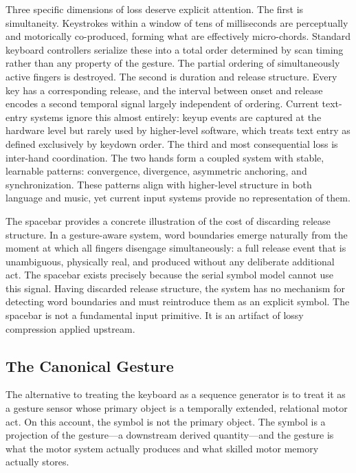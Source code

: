 \documentclass[12pt,a4paper]{article}
\theoremstyle{plain}
\theoremstyle{definition}
\theoremstyle{remark}
\begin{document}
Three specific dimensions of loss deserve explicit attention. The first is
simultaneity. Keystrokes within a window of tens of milliseconds are
perceptually and motorically co-produced, forming what are effectively
micro-chords. Standard keyboard controllers serialize these into a total order
determined by scan timing rather than any property of the gesture. The partial
ordering of simultaneously active fingers is destroyed. The second is duration
and release structure. Every key has a corresponding release, and the interval
between onset and release encodes a second temporal signal largely independent
of ordering. Current text-entry systems ignore this almost entirely: keyup events
are captured at the hardware level but rarely used by higher-level software,
which treats text entry as defined exclusively by keydown order. The third and
most consequential loss is inter-hand coordination. The two hands form a coupled
system with stable, learnable patterns: convergence, divergence, asymmetric
anchoring, and synchronization. These patterns align with higher-level structure
in both language and music, yet current input systems provide no representation
of them.

The spacebar provides a concrete illustration of the cost of discarding release
structure. In a gesture-aware system, word boundaries emerge naturally from the
moment at which all fingers disengage simultaneously: a full release event that
is unambiguous, physically real, and produced without any deliberate additional
act. The spacebar exists precisely because the serial symbol model cannot use
this signal. Having discarded release structure, the system has no mechanism for
detecting word boundaries and must reintroduce them as an explicit symbol. The
spacebar is not a fundamental input primitive. It is an artifact of lossy
compression applied upstream.

\subsection{The Canonical Gesture}

The alternative to treating the keyboard as a sequence generator is to treat it
as a gesture sensor whose primary object is a temporally extended, relational
motor act. On this account, the symbol is not the primary object. The symbol
is a projection of the gesture---a downstream derived quantity---and the gesture
is what the motor system actually produces and what skilled motor memory actually
stores.
\end{document}

